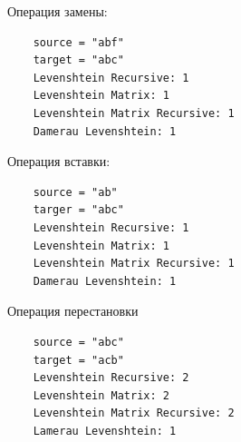 \documentclass[12pt,a4paper]{article}
\begin{document}
Операция замены:
\begin{lstlisting}
	source = "abf"
	target = "abc"
	Levenshtein Recursive: 1
	Levenshtein Matrix: 1
	Levenshtein Matrix Recursive: 1
	Damerau Levenshtein: 1
\end{lstlisting}

Операция вставки:
\begin{lstlisting}
	source = "ab"
	targer = "abc"
	Levenshtein Recursive: 1
	Levenshtein Matrix: 1
	Levenshtein Matrix Recursive: 1
	Damerau Levenshtein: 1
\end{lstlisting}
\clearpage
Операция перестановки
\begin{lstlisting}
	source = "abc"
	target = "acb"
	Levenshtein Recursive: 2
	Levenshtein Matrix: 2
	Levenshtein Matrix Recursive: 2
	Lamerau Levenshtein: 1
\end{lstlisting}
\end{document}
